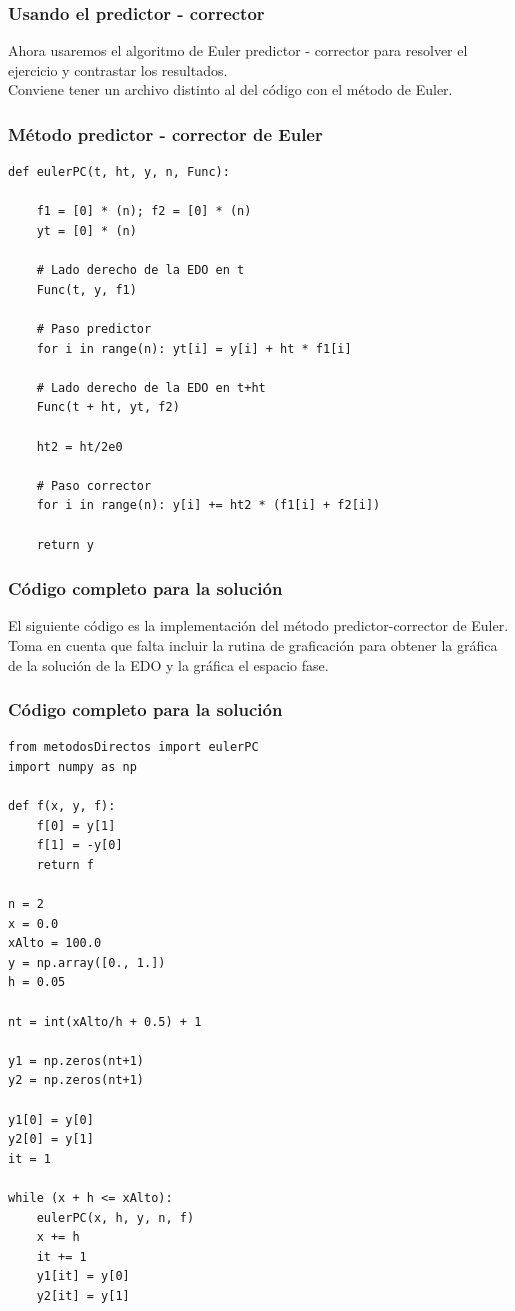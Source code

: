 \documentclass[12pt]{beamer}
\begin{document}
\begin{frame}
\frametitle{Usando el predictor - corrector}
Ahora usaremos el algoritmo de Euler predictor - corrector para resolver el ejercicio y contrastar los resultados.
\\
\bigskip
\pause
Conviene tener un archivo distinto al del código con el método de Euler.
\end{frame}
\begin{frame}
\frametitle{Método predictor - corrector de Euler}
\begin{lstlisting}[caption=Método predictor - corrector de Euler]
def eulerPC(t, ht, y, n, Func):

    f1 = [0] * (n); f2 = [0] * (n)
    yt = [0] * (n)
 
    # Lado derecho de la EDO en t
    Func(t, y, f1)

    # Paso predictor
    for i in range(n): yt[i] = y[i] + ht * f1[i]
    
    # Lado derecho de la EDO en t+ht
    Func(t + ht, yt, f2)
 
    ht2 = ht/2e0

    # Paso corrector
    for i in range(n): y[i] += ht2 * (f1[i] + f2[i])
    
    return y
\end{lstlisting}
\end{frame}
\begin{frame}
\frametitle{Código completo para la solución}
El siguiente código es la implementación del método predictor-corrector de Euler.
\\
\bigskip
\pause
Toma en cuenta que falta incluir la rutina de graficación para obtener la gráfica de la solución de la EDO y la gráfica el espacio fase.
\end{frame}
\begin{frame}
\frametitle{Código completo para la solución}
\begin{lstlisting}[caption=Código completo con el método predictor-corrector de Euler]
from metodosDirectos import eulerPC
import numpy as np

def f(x, y, f):
    f[0] = y[1]
    f[1] = -y[0]
    return f

n = 2
x = 0.0
xAlto = 100.0
y = np.array([0., 1.])
h = 0.05

nt = int(xAlto/h + 0.5) + 1

y1 = np.zeros(nt+1)
y2 = np.zeros(nt+1)

y1[0] = y[0]
y2[0] = y[1]
it = 1

while (x + h <= xAlto):
    eulerPC(x, h, y, n, f)
    x += h
    it += 1
    y1[it] = y[0]
    y2[it] = y[1]
\end{lstlisting}
\end{frame}
\end{document}
